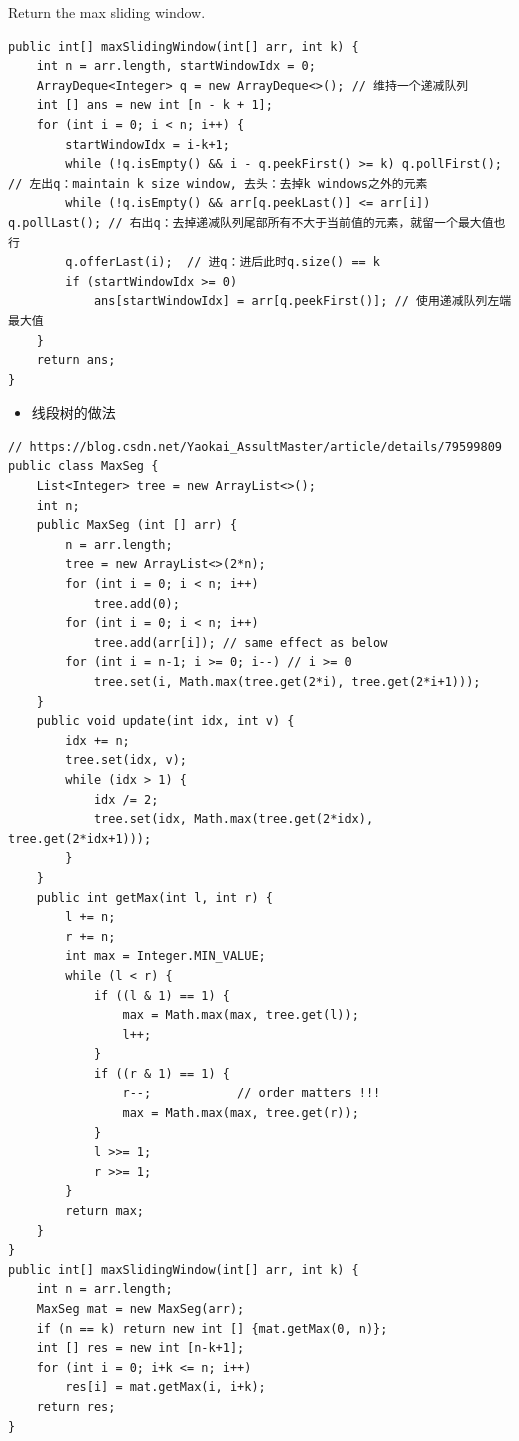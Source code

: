 \documentclass[9pt, b5paaper]{book}
\begin{document}
Return the max sliding window.

\begin{verbatim}
public int[] maxSlidingWindow(int[] arr, int k) {
    int n = arr.length, startWindowIdx = 0;
    ArrayDeque<Integer> q = new ArrayDeque<>(); // 维持一个递减队列
    int [] ans = new int [n - k + 1];
    for (int i = 0; i < n; i++) {
        startWindowIdx = i-k+1;
        while (!q.isEmpty() && i - q.peekFirst() >= k) q.pollFirst();     // 左出q：maintain k size window, 去头：去掉k windows之外的元素
        while (!q.isEmpty() && arr[q.peekLast()] <= arr[i]) q.pollLast(); // 右出q：去掉递减队列尾部所有不大于当前值的元素，就留一个最大值也行
        q.offerLast(i);  // 进q：进后此时q.size() == k 
        if (startWindowIdx >= 0)
            ans[startWindowIdx] = arr[q.peekFirst()]; // 使用递减队列左端最大值
    }
    return ans;
}
\end{verbatim}
\begin{itemize}
\item 线段树的做法
\end{itemize}
\begin{verbatim}
// https://blog.csdn.net/Yaokai_AssultMaster/article/details/79599809
public class MaxSeg {
    List<Integer> tree = new ArrayList<>();
    int n;
    public MaxSeg (int [] arr) {
        n = arr.length;
        tree = new ArrayList<>(2*n);
        for (int i = 0; i < n; i++) 
            tree.add(0);
        for (int i = 0; i < n; i++) 
            tree.add(arr[i]); // same effect as below
        for (int i = n-1; i >= 0; i--) // i >= 0
            tree.set(i, Math.max(tree.get(2*i), tree.get(2*i+1)));
    }
    public void update(int idx, int v) {
        idx += n;
        tree.set(idx, v);
        while (idx > 1) {
            idx /= 2;
            tree.set(idx, Math.max(tree.get(2*idx), tree.get(2*idx+1)));
        }
    }
    public int getMax(int l, int r) {
        l += n;
        r += n;
        int max = Integer.MIN_VALUE;
        while (l < r) {
            if ((l & 1) == 1) {
                max = Math.max(max, tree.get(l));
                l++;
            }
            if ((r & 1) == 1) {
                r--;            // order matters !!!
                max = Math.max(max, tree.get(r));
            }
            l >>= 1;
            r >>= 1;
        }
        return max;
    }
}
public int[] maxSlidingWindow(int[] arr, int k) {
    int n = arr.length;
    MaxSeg mat = new MaxSeg(arr);
    if (n == k) return new int [] {mat.getMax(0, n)};
    int [] res = new int [n-k+1];
    for (int i = 0; i+k <= n; i++) 
        res[i] = mat.getMax(i, i+k);
    return res;
}
\end{verbatim}
\end{document}
